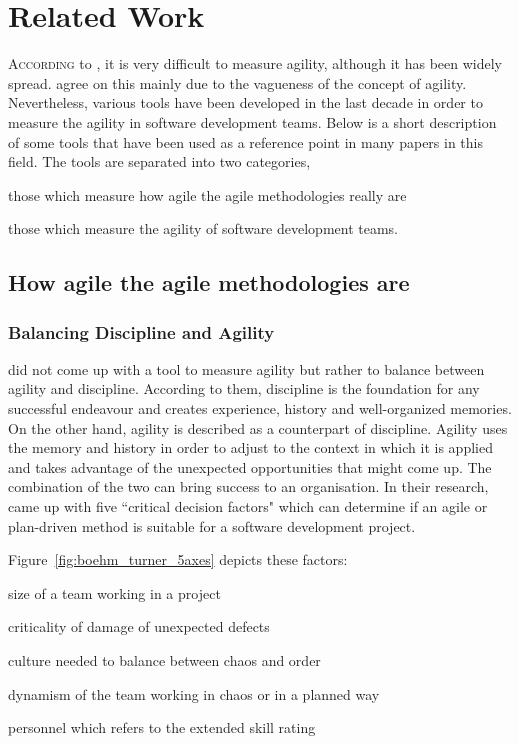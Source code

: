 \chapter{Related Work}\label{ch:related_work}

\lettrine[lines=4, loversize=-0.1, lraise=0.1]{A}{ccording} to \citet{yauch}, it is very difficult to measure agility, although it has been widely spread. \citet{tsourveloudis} agree on this mainly due to the vagueness of the concept of agility. Nevertheless, various tools have been developed in the last decade in order to measure the agility in software development teams. Below is a short description of some tools that have been used as a  reference point in many papers in this field. The tools are separated into two categories, 
\begin{inparaenum} [a\upshape)]
\item those which measure how agile the agile methodologies really are
\item those which measure the agility of software development teams.
\end{inparaenum}


\section{How agile the agile methodologies are}

\subsection{Balancing Discipline and Agility}
\citet{1231450} did not come up with a tool to measure agility but rather to balance between agility and discipline. According to them, discipline is the foundation for any successful endeavour and creates experience, history and well-organized memories. On the other hand, agility is described as a counterpart of discipline. Agility uses the memory and history in order to adjust to the context in which it is applied and takes advantage of the unexpected opportunities that might come up. The combination of the two can bring success to an organisation. In their research, \citet{1231450} came up with five ``critical decision factors" which can determine if an agile or plan-driven method is suitable for a software development project.

Figure~\ref{fig:boehm_turner_5axes} depicts these factors:
\begin{inparaenum} [a\upshape)]
\item size of a team working in a project
\item criticality of damage of unexpected defects
\item culture needed to balance between chaos and order
\item dynamism of the team working in chaos or in a planned way
\item personnel which refers to the extended \citet{cockburn2002agile} skill rating %
\end{inparaenum}

